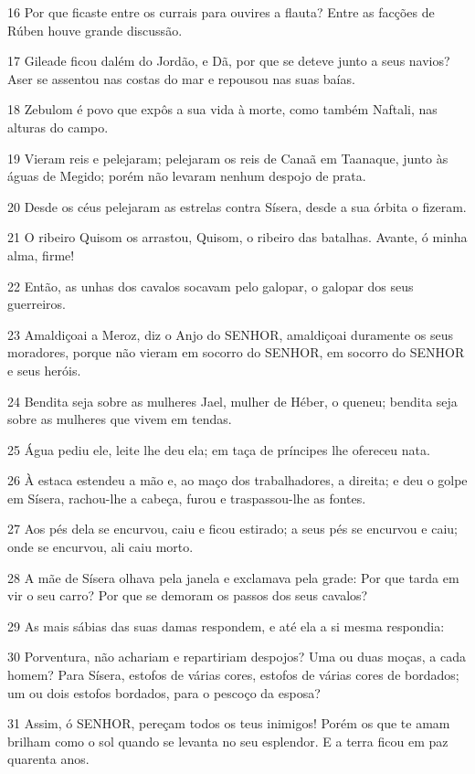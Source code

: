 \par 16 Por que ficaste entre os currais para ouvires a flauta? Entre as facções de Rúben houve grande discussão.
\par 17 Gileade ficou dalém do Jordão, e Dã, por que se deteve junto a seus navios? Aser se assentou nas costas do mar e repousou nas suas baías.
\par 18 Zebulom é povo que expôs a sua vida à morte, como também Naftali, nas alturas do campo.
\par 19 Vieram reis e pelejaram; pelejaram os reis de Canaã em Taanaque, junto às águas de Megido; porém não levaram nenhum despojo de prata.
\par 20 Desde os céus pelejaram as estrelas contra Sísera, desde a sua órbita o fizeram.
\par 21 O ribeiro Quisom os arrastou, Quisom, o ribeiro das batalhas. Avante, ó minha alma, firme!
\par 22 Então, as unhas dos cavalos socavam pelo galopar, o galopar dos seus guerreiros.
\par 23 Amaldiçoai a Meroz, diz o Anjo do SENHOR, amaldiçoai duramente os seus moradores, porque não vieram em socorro do SENHOR, em socorro do SENHOR e seus heróis.
\par 24 Bendita seja sobre as mulheres Jael, mulher de Héber, o queneu; bendita seja sobre as mulheres que vivem em tendas.
\par 25 Água pediu ele, leite lhe deu ela; em taça de príncipes lhe ofereceu nata.
\par 26 À estaca estendeu a mão e, ao maço dos trabalhadores, a direita; e deu o golpe em Sísera, rachou-lhe a cabeça, furou e traspassou-lhe as fontes.
\par 27 Aos pés dela se encurvou, caiu e ficou estirado; a seus pés se encurvou e caiu; onde se encurvou, ali caiu morto.
\par 28 A mãe de Sísera olhava pela janela e exclamava pela grade: Por que tarda em vir o seu carro? Por que se demoram os passos dos seus cavalos?
\par 29 As mais sábias das suas damas respondem, e até ela a si mesma respondia:
\par 30 Porventura, não achariam e repartiriam despojos? Uma ou duas moças, a cada homem? Para Sísera, estofos de várias cores, estofos de várias cores de bordados; um ou dois estofos bordados, para o pescoço da esposa?
\par 31 Assim, ó SENHOR, pereçam todos os teus inimigos! Porém os que te amam brilham como o sol quando se levanta no seu esplendor. E a terra ficou em paz quarenta anos.

